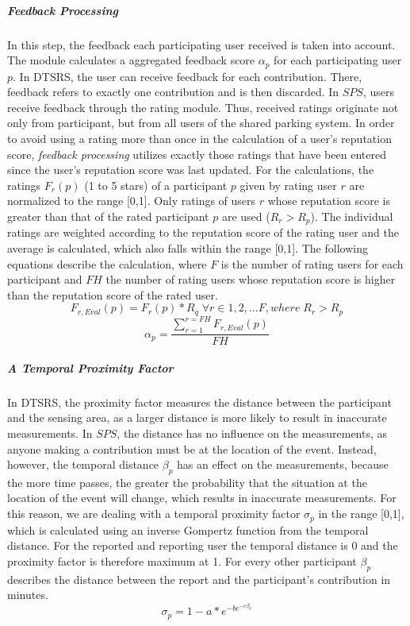 \subparagraph{Feedback Processing}In this step, the feedback each participating user received is taken into account. The module calculates a aggregated feedback score $\alpha_p$ for each participating user $p$. In DTSRS, the user can receive feedback for each contribution. There, feedback refers to exactly one contribution and is then discarded. In $SPS$, users receive feedback through the rating module. Thus, received ratings originate not only from participant, but from all users of the shared parking system. In order to avoid using a rating more than once in the calculation of a user's reputation score, \textit{feedback processing} utilizes exactly those ratings that have been entered since the user's reputation score was last updated. For the calculations, the ratings $F_r(p)$ (1 to 5 stars) of a participant $p$ given by rating user $r$ are normalized to the range [0,1]. Only ratings of users $r$ whose reputation score is greater than that of the rated participant $p$ are used ($R_r>R_p$). The individual ratings are weighted according to the reputation score of the rating user and the average is calculated, which also falls within the range [0,1]. The following equations describe the calculation, where $F$ is the number of rating users for each participant and $FH$ the number of rating users whose reputation score is higher than the reputation score of the rated user.
\begin{equation}
  F_{r,Eval}(p)=F_r(p)*R_q\; \forall r \in 1,2,...F, where\; R_r>R_p 
\end{equation}
\begin{equation}
  \alpha_p = \frac{\sum_{r=1}^{r=FH}F_{r,Eval}(p)}{FH}
\end{equation}

\subparagraph{A Temporal Proximity Factor} In DTSRS, the proximity factor measures the distance between the participant and the sensing area, as a larger distance is more likely to result in inaccurate measurements. In $SPS$, the distance has no influence on the measurements, as anyone making a contribution must be at the location of the event. Instead, however, the temporal distance $\beta_p$ has an effect on the measurements, because the more time passes, the greater the probability that the situation at the location of the event will change, which results in inaccurate measurements. For this reason, we are dealing with a temporal proximity factor $\sigma_p$ in the range [0,1], which is calculated using an inverse Gompertz function from the temporal distance. For the reported and reporting user the temporal distance is 0 and the proximity factor is therefore maximum at 1. For every other participant $\beta_p$ describes the distance between the report and the participant's contribution in minutes.
\begin{equation}
  \sigma_p = 1 - a * e^{-be^{-c\beta_p}}
\end{equation}

